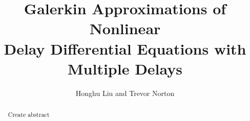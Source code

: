 \documentclass{./styles/siamart1116} %
\title{Galerkin Approximations of Nonlinear \\ Delay Differential Equations with Multiple Delays}
\author{Honghu Liu and Trevor Norton}
\date{}
\numberwithin{equation}{section}
\begin{document}
\maketitle

\begin{abstract}
{\attn Create abstract}
\end{abstract}









\appendix




\end{document}
